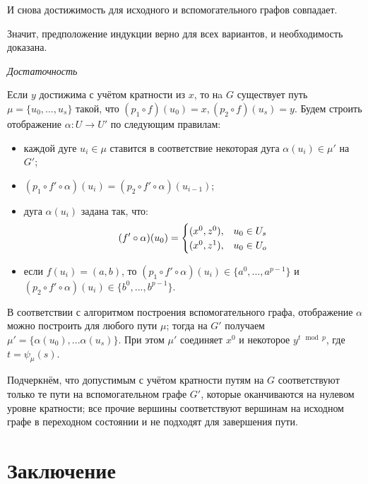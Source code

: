 \begin{myproof}
		И снова достижимость для исходного и вспомогательного графов совпадает. 
		
		Значит, предположение индукции верно для всех вариантов, и необходимость доказана.
		
		\textit {Достаточность}
		
		Если $y$ достижима с учётом кратности из $x$, то нa $G$ существует путь $\mu = \{u_0, ... , u_s\}$ такой, что $(p_1 \circ f)(u_0) = x, (p_2 \circ f)(u_s) = y$. Будем строить отображение $\alpha:U\to U'$ по следующим правилам:
		
		\begin{itemize}
			\item каждой дуге $u_i \in \mu$ ставится в соответствие некоторая дуга $\alpha(u_i) \in \mu'$ на $G'$;
			\item $(p_1 \circ f' \circ \alpha)(u_i) = (p_2 \circ f' \circ \alpha)(u_{i-1})$;
			\item дуга $\alpha(u_i)$ задана так, что: 
			\begin{equation*}
			(f' \circ \alpha)(u_0) =
			\begin{cases}
			(x^0, z^0), &\text{$ u_0 \in U_s$}\\
			(x^0, z^1), &\text{$ u_0 \in U_o$}
			\end{cases}
			\end{equation*} 
			
			\item если $f(u_i) = (a, b)$, то $(p_1 \circ f' \circ \alpha)(u_i) \in \{a^0, ... , a^{p-1}\}$ и $(p_2 \circ f' \circ \alpha)(u_i) \in \{b^0, ... , b^{p-1}\}$.
		\end{itemize}
		
		В соответствии с алгоритмом построения вспомогательного графа, отображение $\alpha$ можно построить для любого пути $\mu$; тогда на $G'$ получаем $\mu' = \{\alpha(u_0), ...  \alpha(u_s)\}$. При этом $\mu'$ соединяет $x^0$ и некоторое $y^{t \mod p}$, где $t = \psi_\mu(s)$.
	\end{myproof}
	
	Подчеркнём, что допустимым с учётом кратности путям на $G$ соответствуют только те пути на вспомогательном графе $G'$, которые оканчиваются на нулевом уровне кратности; все прочие вершины соответствуют вершинам на исходном графе в переходном состоянии и не подходят для завершения пути.  
	
	\section{Заключение}
	

